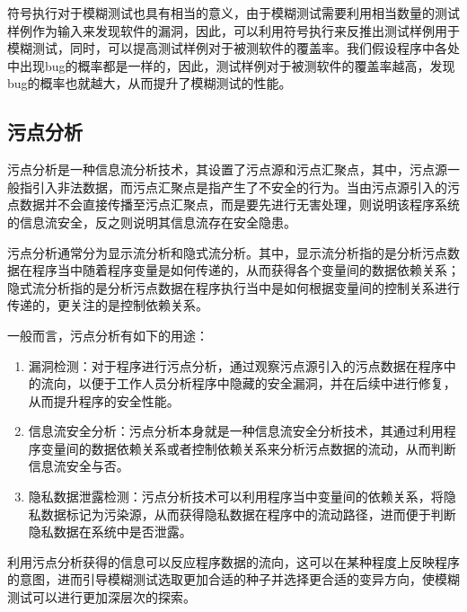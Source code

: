 符号执行对于模糊测试也具有相当的意义，由于模糊测试需要利用相当数量的测试样例作为输入来发现软件的漏洞，因此，可以利用符号执行来反推出测试样例用于模糊测试，同时，可以提高测试样例对于被测软件的覆盖率。我们假设程序中各处中出现bug的概率都是一样的，因此，测试样例对于被测软件的覆盖率越高，发现bug的概率也就越大，从而提升了模糊测试的性能。

\subsection{污点分析}

污点分析是一种信息流分析技术，其设置了污点源和污点汇聚点，其中，污点源一般指引入非法数据，而污点汇聚点是指产生了不安全的行为。当由污点源引入的污点数据并不会直接传播至污点汇聚点，而是要先进行无害处理，则说明该程序系统的信息流安全，反之则说明其信息流存在安全隐患。

污点分析通常分为显示流分析和隐式流分析。其中，显示流分析指的是分析污点数据在程序当中随着程序变量是如何传递的，从而获得各个变量间的数据依赖关系；隐式流分析指的是分析污点数据在程序执行当中是如何根据变量间的控制关系进行传递的，更关注的是控制依赖关系。

一般而言，污点分析有如下的用途：
\begin{enumerate}
\item 漏洞检测：对于程序进行污点分析，通过观察污点源引入的污点数据在程序中的流向，以便于工作人员分析程序中隐藏的安全漏洞，并在后续中进行修复，从而提升程序的安全性能。
\item 信息流安全分析：污点分析本身就是一种信息流安全分析技术，其通过利用程序变量间的数据依赖关系或者控制依赖关系来分析污点数据的流动，从而判断信息流安全与否。
\item 隐私数据泄露检测：污点分析技术可以利用程序当中变量间的依赖关系，将隐私数据标记为污染源，从而获得隐私数据在程序中的流动路径，进而便于判断隐私数据在系统中是否泄露。
\end{enumerate}

利用污点分析获得的信息可以反应程序数据的流向，这可以在某种程度上反映程序的意图，进而引导模糊测试选取更加合适的种子并选择更合适的变异方向，使模糊测试可以进行更加深层次的探索\cite{gan2020greyone}。